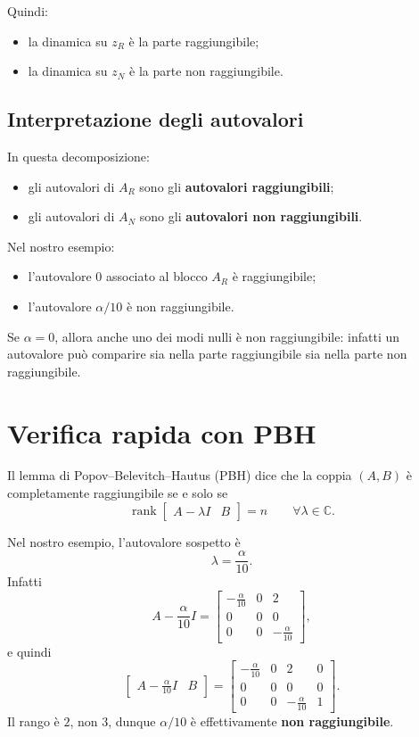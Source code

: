 Quindi:
\begin{itemize}
    \item la dinamica su \(z_R\) è la parte raggiungibile;
    \item la dinamica su \(z_N\) è la parte non raggiungibile.
\end{itemize}

\subsection{Interpretazione degli autovalori}

In questa decomposizione:
\begin{itemize}
    \item gli autovalori di \(A_R\) sono gli \textbf{autovalori raggiungibili};
    \item gli autovalori di \(A_N\) sono gli \textbf{autovalori non raggiungibili}.
\end{itemize}

Nel nostro esempio:
\begin{itemize}
    \item l’autovalore \(0\) associato al blocco \(A_R\) è raggiungibile;
    \item l’autovalore \(\alpha/10\) è non raggiungibile.
\end{itemize}

Se \(\alpha=0\), allora anche uno dei modi nulli è non raggiungibile: infatti un autovalore può comparire sia nella parte raggiungibile sia nella parte non raggiungibile.

\section{Verifica rapida con PBH}

Il lemma di Popov--Belevitch--Hautus (PBH) dice che la coppia \((A,B)\) è completamente raggiungibile se e solo se
\[
\operatorname{rank}\!\begin{bmatrix}A-\lambda I & B\end{bmatrix}=n
\qquad
\forall \lambda\in\mathbb C.
\]

Nel nostro esempio, l’autovalore sospetto è
\[
\lambda=\frac{\alpha}{10}.
\]
Infatti
\[
A-\frac{\alpha}{10}I=
\begin{bmatrix}
-\frac{\alpha}{10} & 0 & 2\\
0 & 0 & 0\\
0 & 0 & -\frac{\alpha}{10}
\end{bmatrix},
\]
e quindi
\[
\begin{bmatrix}
A-\frac{\alpha}{10}I & B
\end{bmatrix}
=
\begin{bmatrix}
-\frac{\alpha}{10} & 0 & 2 & 0\\
0 & 0 & 0 & 0\\
0 & 0 & -\frac{\alpha}{10} & 1
\end{bmatrix}.
\]
Il rango è \(2\), non \(3\), dunque \(\alpha/10\) è effettivamente \textbf{non raggiungibile}.

